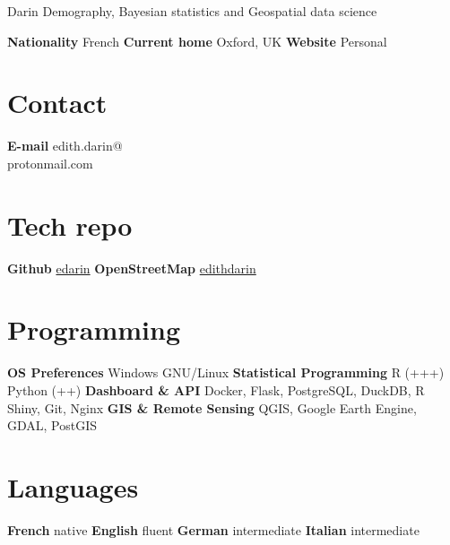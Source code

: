 \documentclass[
]{friggeri-cv}
\author{}
\date{\vspace{-2.5em}}
\begin{document}
 { Darin}
{\qquad \qquad  \qquad  \qquad Demography, Bayesian statistics and Geospatial data science}


\begin{aside}
\textbf{Nationality}
French
\textbf{Current home}
Oxford, UK
\textbf{Website}
Personal \href{https://edarin.github.io/thatsme/}{\scriptsize{}}
~
\section{Contact}
\textbf{E-mail}
edith.darin@\\protonmail.com
~
\section{Tech repo}
\textbf{Github}
\href{https://github.com/edarin}{edarin}
\textbf{OpenStreetMap}
\href{https://www.openstreetmap.org/user/edithdarin/history#map=5/22.938/11.470}{edithdarin}
~
\section{Programming}
\textbf{OS Preferences}
Windows
GNU/Linux
\textbf{Statistical Programming}
R (+++)
Python (++)
\textbf{Dashboard \& API}
Docker, Flask, PostgreSQL, DuckDB, R Shiny, Git, Nginx
\textbf{GIS \& Remote Sensing}
QGIS, Google Earth Engine, GDAL, PostGIS
~
\section{Languages}
\textbf{French} native
\textbf{English} fluent
\textbf{German} intermediate
\textbf{Italian} intermediate
~
\end{aside}
\end{document}
